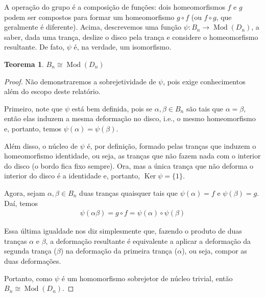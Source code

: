 \documentclass[a4paper,portuguese,11pt,twoside, leqno]{book}
\DeclareMathOperator{\Mod}{Mod}
\DeclareMathOperator{\Ker}{Ker}
\theoremstyle{definition}
\newtheorem{theorem}{Teorema}[section]
\begin{document}
	\par\vspace{0.3cm} A operação do grupo é a composição de funções: dois homeomorfismos $f$ e $g$ podem ser compostos para formar um homeomorfismo $g\circ f$ (ou $f\circ g$, que geralmente é diferente). Acima, descrevemos uma função $\psi: B_n\to\Mod(D_n)$, a saber, dada uma trança, deslize o disco pela trança e considere o homeomorfismo resultante. De fato, $\psi$ é, na verdade, um isomorfismo.
	
	\begin{theorem}
		\label{B_n isomorfo a Mod(D_n)}
		$B_n\cong \Mod(D_n)$ 
	\end{theorem}
	
	\begin{proof}
		Não demonstraremos a sobrejetividade de $\psi$, pois exige conhecimentos além do escopo deste relatório.
		\par\vspace{0.3cm} Primeiro, note que $\psi$ está bem definida, pois se $\alpha, \beta\in B_n$ são tais que $\alpha = \beta$, então elas induzem a mesma deformação no disco, i.e., o mesmo homeomorfismo e, portanto, temos $\psi(\alpha) = \psi(\beta)$.
		\par\vspace{0.3cm} Além disso, o núcleo de $\psi$ é, por definição, formado pelas tranças que induzem o homeomorfismo identidade, ou seja, as tranças que não fazem nada com o interior do disco (o bordo fica fixo sempre). Ora, mas a única trança que não deforma o interior do disco é a identidade e, portanto, $\Ker\psi = \{1\}$.
		\par\vspace{0.3cm} Agora, sejam $\alpha, \beta\in B_n$ duas tranças quaisquer tais que $\psi(\alpha) = f$ e $\psi(\beta) = g$. Daí, temos
		\begin{align*}
		\psi(\alpha\beta) = g\circ f = \psi(\alpha)\circ\psi(\beta)
		\end{align*}
		\par\vspace{0.3cm} Essa última igualdade nos diz simplesmente que, fazendo o produto de duas tranças $\alpha$ e $\beta$, a deformação resultante é equivalente a aplicar a deformação da segunda trança ($\beta$) na deformação da primeira trança ($\alpha$), ou seja, compor as duas deformações. 
		\par\vspace{0.3cm} Portanto, como $\psi$ é um homomorfismo sobrejetor de núcleo trivial, então $B_n\cong\Mod(D_n)$.
	\end{proof}
	
\end{document}
